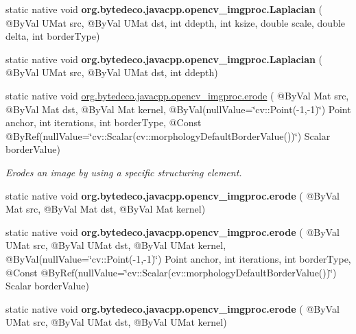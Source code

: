 \begin{DoxyCompactItemize}
static native void {\bfseries org.\+bytedeco.\+javacpp.\+opencv\+\_\+imgproc.\+Laplacian} ( @By\+Val U\+Mat src, @By\+Val U\+Mat dst, int ddepth, int ksize, double scale, double delta, int border\+Type)
\item 
\mbox{\label{group__imgproc__filter_gaef7e4f2a12bc667667e94f5706fc7576}} 
static native void {\bfseries org.\+bytedeco.\+javacpp.\+opencv\+\_\+imgproc.\+Laplacian} ( @By\+Val U\+Mat src, @By\+Val U\+Mat dst, int ddepth)
\item 
static native void \hyperlink{group__imgproc__filter_ga8c0cbcc8dd271aada560698924d19cb2}{org.\+bytedeco.\+javacpp.\+opencv\+\_\+imgproc.\+erode} ( @By\+Val Mat src, @By\+Val Mat dst, @By\+Val Mat kernel, @By\+Val(null\+Value=\char`\"{}cv\+::\+Point(-\/1,-\/1)\char`\"{}) Point anchor, int iterations, int border\+Type, @Const @By\+Ref(null\+Value=\char`\"{}cv\+::\+Scalar(cv\+::morphology\+Default\+Border\+Value())\char`\"{}) Scalar border\+Value)
\begin{DoxyCompactList}\small\item\em Erodes an image by using a specific structuring element. \end{DoxyCompactList}\item 
\mbox{\label{group__imgproc__filter_ga650836745d55fe30014d0893f9bc7571}} 
static native void {\bfseries org.\+bytedeco.\+javacpp.\+opencv\+\_\+imgproc.\+erode} ( @By\+Val Mat src, @By\+Val Mat dst, @By\+Val Mat kernel)
\item 
\mbox{\label{group__imgproc__filter_ga49298d4b54f3535b97b7b03ed29c978a}} 
static native void {\bfseries org.\+bytedeco.\+javacpp.\+opencv\+\_\+imgproc.\+erode} ( @By\+Val U\+Mat src, @By\+Val U\+Mat dst, @By\+Val U\+Mat kernel, @By\+Val(null\+Value=\char`\"{}cv\+::\+Point(-\/1,-\/1)\char`\"{}) Point anchor, int iterations, int border\+Type, @Const @By\+Ref(null\+Value=\char`\"{}cv\+::\+Scalar(cv\+::morphology\+Default\+Border\+Value())\char`\"{}) Scalar border\+Value)
\item 
\mbox{\label{group__imgproc__filter_gaa69046fef163679ef621d83d2b3d3862}} 
static native void {\bfseries org.\+bytedeco.\+javacpp.\+opencv\+\_\+imgproc.\+erode} ( @By\+Val U\+Mat src, @By\+Val U\+Mat dst, @By\+Val U\+Mat kernel)
\item 
\mbox{\label{group__imgproc__filter_gaa693157393014e3fb1c9a3b4f69e34b2}} 

\end{DoxyCompactItemize}
